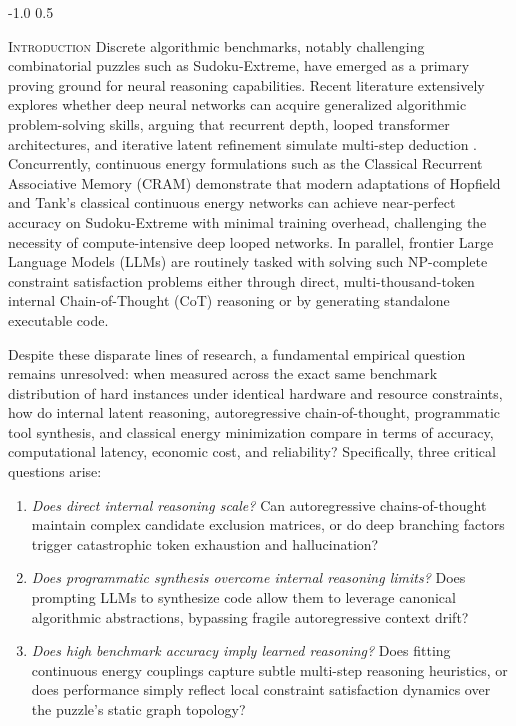 \documentclass{article} %
\makeatletter
\renewcommand{\section}{\@startsection{section}{1}{\z@}%
  {-1.0\baselineskip}%
  {0.5\baselineskip}%
  {\normalfont\fontsize{12}{14}\selectfont\raggedright\scshape}}
\makeatother
\begin{document}
\section{\textsc{Introduction}}
\label{sec:intro}
Discrete algorithmic benchmarks, notably challenging combinatorial puzzles such as Sudoku-Extreme, have emerged as a primary proving ground for neural reasoning capabilities. Recent literature extensively explores whether deep neural networks can acquire generalized algorithmic problem-solving skills, arguing that recurrent depth, looped transformer architectures, and iterative latent refinement simulate multi-step deduction \citep{Shah2024CausalLanguage, Saunshi2025ReasoningLatent, Feinashley2026SolveLoop}. Concurrently, continuous energy formulations such as the Classical Recurrent Associative Memory (CRAM) demonstrate that modern adaptations of Hopfield and Tank's classical continuous energy networks can achieve near-perfect accuracy on Sudoku-Extreme with minimal training overhead, challenging the necessity of compute-intensive deep looped networks. In parallel, frontier Large Language Models (LLMs) are routinely tasked with solving such NP-complete constraint satisfaction problems either through direct, multi-thousand-token internal Chain-of-Thought (CoT) reasoning or by generating standalone executable code.

Despite these disparate lines of research, a fundamental empirical question remains unresolved: when measured across the exact same benchmark distribution of hard instances under identical hardware and resource constraints, how do internal latent reasoning, autoregressive chain-of-thought, programmatic tool synthesis, and classical energy minimization compare in terms of accuracy, computational latency, economic cost, and reliability? Specifically, three critical questions arise:
\begin{enumerate}
    \item \textit{Does direct internal reasoning scale?} Can autoregressive chains-of-thought maintain complex candidate exclusion matrices, or do deep branching factors trigger catastrophic token exhaustion and hallucination?
    \item \textit{Does programmatic synthesis overcome internal reasoning limits?} Does prompting LLMs to synthesize code allow them to leverage canonical algorithmic abstractions, bypassing fragile autoregressive context drift?
    \item \textit{Does high benchmark accuracy imply learned reasoning?} Does fitting continuous energy couplings capture subtle multi-step reasoning heuristics, or does performance simply reflect local constraint satisfaction dynamics over the puzzle's static graph topology?
\end{enumerate}
\end{document}
